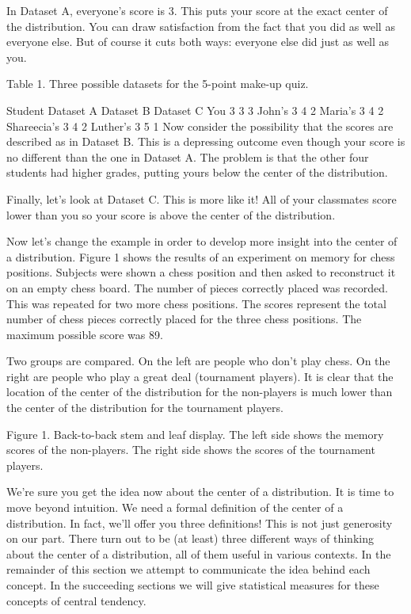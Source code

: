 \documentclass[
]{book}
\begin{document}
In Dataset A, everyone's score is 3. This puts your score at the exact center of the distribution. You can draw satisfaction from the fact that you did as well as everyone else. But of course it cuts both ways: everyone else did just as well as you.

Table 1. Three possible datasets for the 5-point make-up quiz.

Student Dataset A Dataset B Dataset C
You 3 3 3
John's 3 4 2
Maria's 3 4 2
Shareecia's 3 4 2
Luther's 3 5 1
Now consider the possibility that the scores are described as in Dataset B. This is a depressing outcome even though your score is no different than the one in Dataset A. The problem is that the other four students had higher grades, putting yours below the center of the distribution.

Finally, let's look at Dataset C. This is more like it! All of your classmates score lower than you so your score is above the center of the distribution.

Now let's change the example in order to develop more insight into the center of a distribution. Figure 1 shows the results of an experiment on memory for chess positions. Subjects were shown a chess position and then asked to reconstruct it on an empty chess board. The number of pieces correctly placed was recorded. This was repeated for two more chess positions. The scores represent the total number of chess pieces correctly placed for the three chess positions. The maximum possible score was 89.

Two groups are compared. On the left are people who don't play chess. On the right are people who play a great deal (tournament players). It is clear that the location of the center of the distribution for the non-players is much lower than the center of the distribution for the tournament players.

Figure 1. Back-to-back stem and leaf display. The left side shows the memory scores of the non-players. The right side shows the scores of the tournament players.

We're sure you get the idea now about the center of a distribution. It is time to move beyond intuition. We need a formal definition of the center of a distribution. In fact, we'll offer you three definitions! This is not just generosity on our part. There turn out to be (at least) three different ways of thinking about the center of a distribution, all of them useful in various contexts. In the remainder of this section we attempt to communicate the idea behind each concept. In the succeeding sections we will give statistical measures for these concepts of central tendency.
\end{document}

